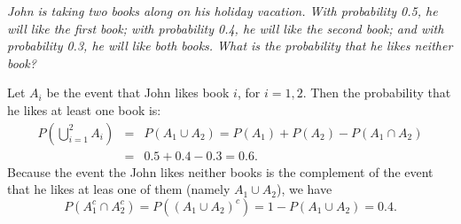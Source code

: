 \documentclass[notes=show, handout]{beamer}\usepackage[]{graphicx}\usepackage[]{color}
\newcommand{\bea}{\begin{eqnarray}}
\newcommand{\eea}{\end{eqnarray}}
\newcommand{\nn}{\nonumber}
\begin{document}
\begin{frame}{\secname}

  \begin{example}
  \begin{small}
  \textit{John is taking two books along on his holiday vacation. With probability 0.5, he will like the first book; with probability 0.4, he will like the
  second book; and with probability 0.3, he will like both books. What is the probability that he likes neither book?}

  \vspace{0.2cm}

  \begin{footnotesize}
  Let $A_i$ be the event that John likes book $i$, for $i=1,2$. Then the probability that he likes at least one book is:
  \bea
  P(\bigcup_{i=1}^2 A_i) &=& P(A_1 \cup A_2) = P(A_1) + P(A_2) - P(A_1\cap A_2) \nn \\
  &=& 0.5 + 0.4 -0.3 =0.6. \nn
  \eea
  Because the event the John likes neither books is the complement of the event that he likes at leas one of them (namely $A_1 \cup A_2$), we have
  $$
  P(A^{c}_1 \cap A^{c}_2 ) = P((A_1 \cup A_2)^c) = 1- P (A_1 \cup A_2) = 0.4.
  $$
  \end{footnotesize}
  \end{small}
  \end{example}
\end{frame}
\end{document}
